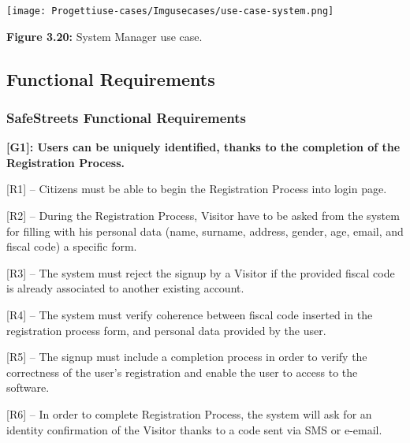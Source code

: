 \documentclass[12pt]{article}
\begin{document}
\begin{center}
\texttt{[image: Progettiuse-cases/Imgusecases/use-case-system.png]}                  

\textbf{Figure 3.20:} System Manager use case. 
\end{center}

\newpage

\subsection{Functional Requirements}
\vspace{5mm}

\subsubsection{SafeStreets Functional Requirements}
\vspace{2mm}%
\textbf{[G1]: Users can be uniquely identified, thanks to the completion of the Registration Process.}
\vspace{2mm}
\begin{flushleft}


[R1] -- Citizens must be able to begin the Registration Process into login page.
\vspace{2mm}

[R2] – During the Registration Process, Visitor have to be asked from the system for filling with his personal data (name, surname, address, gender, age, email, and fiscal code) a specific form.
\vspace{2mm}

[R3] – The system must reject the signup by a Visitor if the provided fiscal code is already associated to another existing account.
\vspace{2mm}

[R4] – The system must verify coherence between fiscal code inserted in the registration process form, and personal data provided by the user.
\vspace{2mm}

[R5] – The signup must include a completion process in order to verify the correctness of the user’s registration and enable the user to access to the software.
\vspace{2mm}

[R6] -- In order to complete Registration Process, the system will ask for an identity confirmation of the Visitor thanks to a code sent via SMS or e-email.
\end{flushleft}
\end{document}
